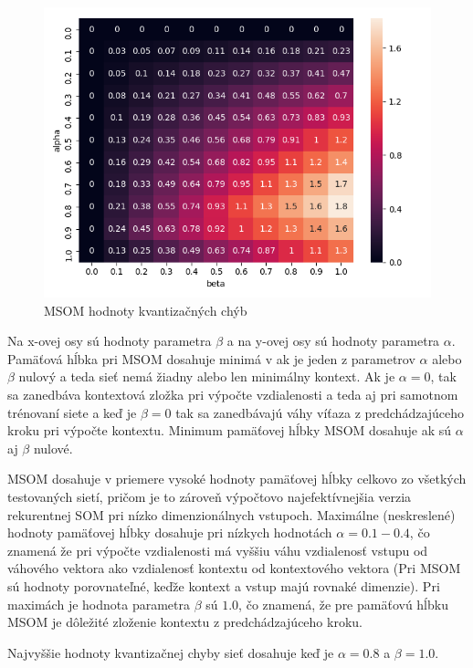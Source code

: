     \begin{figure}[H]
        \centering
        \includegraphics[width=\textwidth]{assets/msom_errors}
        \caption{MSOM hodnoty kvantizačných chýb}
    \end{figure}

 Na x-ovej osy sú hodnoty parametra $\beta$ a na y-ovej osy sú hodnoty parametra $\alpha$. 
 Pamäťová hĺbka pri MSOM dosahuje minimá v ak je jeden z parametrov $\alpha$ alebo $\beta$ nulový a teda sieť nemá
 žiadny alebo len minimálny kontext. Ak je $\alpha = 0$, tak sa zanedbáva kontextová zložka pri výpočte vzdialenosti a 
 teda aj pri samotnom trénovaní siete a keď je $\beta = 0$ tak sa zanedbávajú váhy víťaza z predchádzajúceho kroku pri výpočte kontextu.
 Minimum pamäťovej hĺbky MSOM dosahuje ak sú $\alpha$ aj $\beta$ nulové.

 MSOM dosahuje v priemere vysoké hodnoty pamäťovej hĺbky celkovo zo všetkých testovaných sietí, pričom je to zároveň 
 výpočtovo najefektívnejšia verzia rekurentnej SOM pri nízko dimenzionálnych vstupoch. 
 Maximálne (neskreslené) hodnoty pamäťovej hĺbky dosahuje pri nízkych hodnotách $\alpha = 0.1-0.4$, čo znamená že pri výpočte vzdialenosti má vyššiu váhu vzdialenosť vstupu od 
 váhového vektora ako vzdialenosť kontextu od kontextového vektora (Pri MSOM sú hodnoty porovnateľné, keďže kontext a vstup majú rovnaké dimenzie). 
 Pri maximách je hodnota parametra $\beta$ sú $1.0$, čo znamená, že pre pamäťovú hĺbku MSOM je dôležité zloženie kontextu z predchádzajúceho kroku.

 Najvyššie hodnoty kvantizačnej chyby sieť dosahuje keď je $\alpha = 0.8$ a $\beta = 1.0$.

